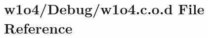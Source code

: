 \hypertarget{w1o4_8c_8o_8d}{}\section{w1o4/\+Debug/w1o4.c.\+o.\+d File Reference}
\label{w1o4_8c_8o_8d}
